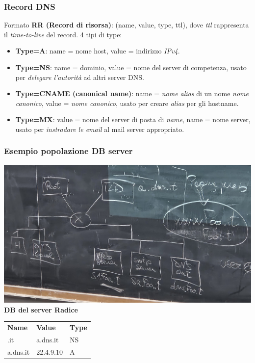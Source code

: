 \subsubsection{Record DNS}
Formato \textbf{RR (Record di risorsa)}: (name, value, type, ttl), dove \textit{ttl} rappresenta il \textit{time-to-live} del record.
4 tipi di type:
\begin{itemize}
  \item \textbf{Type=A}: name = nome host, value = indirizzo \textit{IPv4}.
  \item \textbf{Type=NS}: name = dominio, value = nome del server di competenza, usato per \textit{delegare l'autorità} ad altri server DNS.
  \item \textbf{Type=CNAME (canonical name)}: name = \textit{nome alias} di un nome \textit{nome canonico}, value = \textit{nome canonico}, usato per creare \textit{alias} per gli hostname.
  \item \textbf{Type=MX}: value = nome del server di posta di \textit{name}, name = nome server, usato per \textit{instradare le email} al mail server appropriato.
\end{itemize}

\subsubsection*{Esempio popolazione DB server}

\includegraphics[width=\textwidth]{./img/dbdns.jpg} \\

\bigskip
\textbf{DB del server Radice} \newline
\begin{tabular}{lll}
\textbf{Name} & \textbf{Value} & \textbf{Type} \\
.it           & a.dns.it       & NS            \\
a.dns.it      & 22.4.9.10      & A             
\end{tabular} \\

